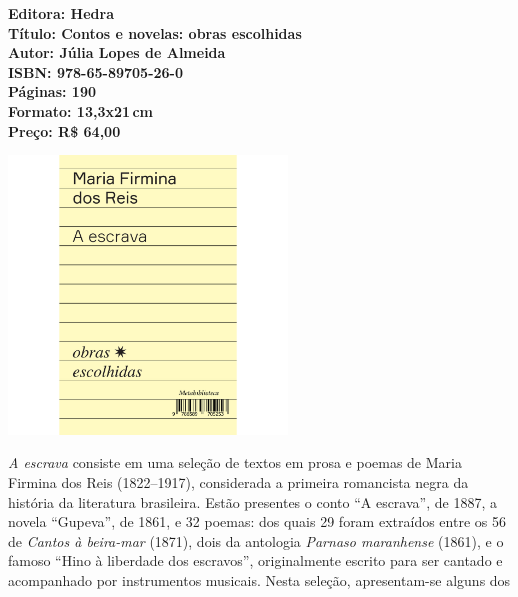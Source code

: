 \vfill
\noindent\begin{minipage}[c]{1\linewidth}
{\small\textbf{
\hspace*{-.1cm}Editora: Hedra\\
Título: Contos e novelas: obras escolhidas\\
Autor: Júlia Lopes de Almeida\\ 
ISBN: 978-65-89705-26-0\\
Páginas: 190\\
Formato: 13,3x21\,cm\\
Preço: R\$ 64,00\\
}}
\end{minipage}
\pagebreak

\begin{center}
\hspace*{.5cm}\includegraphics[width=74mm]{./CAPAS/HEDRA_FIRMINA.jpg}
\end{center}
\hspace*{-7cm}\hrulefill\hspace*{-7cm}
\medskip

\noindent{}\textit{A escrava} consiste em uma seleção de textos em prosa e poemas de Maria Firmina dos Reis (1822–1917), considerada a primeira romancista negra da história da literatura brasileira. Estão presentes o conto ``A escrava'', de 1887, a novela ``Gupeva'', de 1861, e 32 poemas: dos quais 29 foram extraídos entre os 56 de \textit{Cantos à beira-mar} (1871), dois da antologia \textit{Parnaso maranhense} (1861), e o famoso ``Hino à liberdade dos escravos'', originalmente escrito para ser cantado e acompanhado por instrumentos musicais. Nesta seleção, apresentam-se alguns dos 

